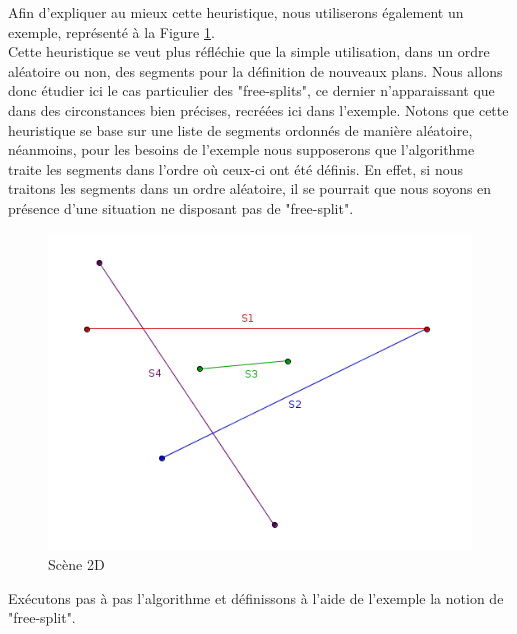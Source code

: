 \documentclass[11pt,a4paper]{article}
\begin{document}
Afin d'expliquer au mieux cette heuristique, nous utiliserons également un exemple, représenté à la Figure \ref{scene_splits}. \\

Cette heuristique se veut plus réfléchie que la simple utilisation, dans un ordre aléatoire ou non, des segments pour la définition de nouveaux plans. Nous allons donc étudier ici le cas particulier des "free-splits", ce dernier n'apparaissant que dans des circonstances bien précises, recréées ici dans l'exemple. Notons que cette heuristique se base sur une liste de segments ordonnés de manière aléatoire, néanmoins, pour les besoins de l'exemple nous supposerons que l'algorithme traite les segments dans l'ordre où ceux-ci ont été définis. En effet, si nous traitons les segments dans un ordre aléatoire, il se pourrait que nous soyons en présence d'une situation ne disposant pas de "free-split".

\begin{figure}[!h]
\centering
\includegraphics[scale=0.5]{free_splits_2.png}
\caption{Scène 2D}
\label{scene_splits}
\end{figure}

Exécutons pas à pas l'algorithme et définissons à l'aide de l'exemple la notion de "free-split". \\
\end{document}
